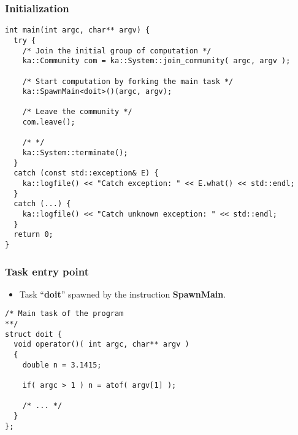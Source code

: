 \begin{frame}[fragile]
  \frametitle{Initialization}
\begin{minipage}[t]{\textwidth}
\begin{block}{}
\begin{lstlisting}
int main(int argc, char** argv) {
  try {
    /* Join the initial group of computation */
    ka::Community com = ka::System::join_community( argc, argv );
    
    /* Start computation by forking the main task */
    ka::SpawnMain<doit>()(argc, argv); 
    
    /* Leave the community */
    com.leave();

    /* */
    ka::System::terminate();
  }
  catch (const std::exception& E) {
    ka::logfile() << "Catch exception: " << E.what() << std::endl;
  }
  catch (...) {
    ka::logfile() << "Catch unknown exception: " << std::endl;
  }
  return 0;
}
\end{lstlisting}
\end{block}
\end{minipage}
\end{frame}
\begin{frame}[fragile]
  \frametitle{Task entry point}
  \begin{itemize}
  \item Task ``\textbf{doit}'' spawned by the instruction \textbf{SpawnMain}.
  \end{itemize}
  \begin{block}{}
  \begin{lstlisting}
/* Main task of the program
**/
struct doit {
  void operator()( int argc, char** argv )
  {
    double n = 3.1415;

    if( argc > 1 ) n = atof( argv[1] );

    /* ... */
  }
};
  \end{lstlisting}
  \end{block}
\end{frame}
